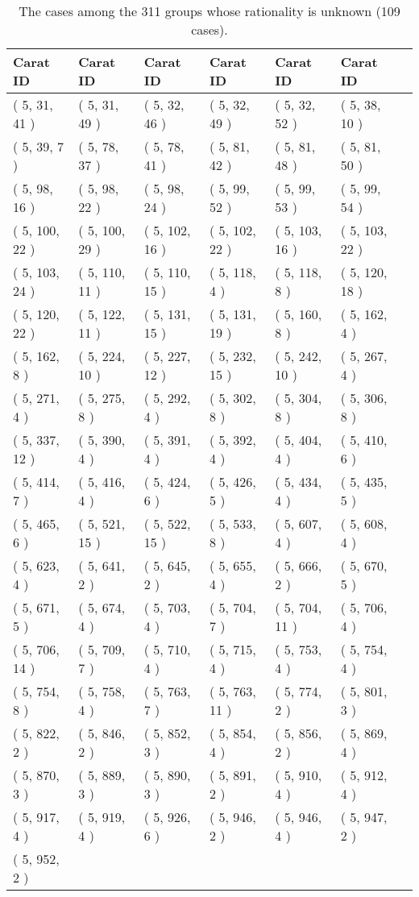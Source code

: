 \begin{table}
\begin{tabular}{lllllll}
Carat ID & Carat ID & Carat ID & Carat ID & Carat ID & Carat ID   \\
\hline
( 5, 31, 41 ) & ( 5, 31, 49 ) & ( 5, 32, 46 ) & ( 5, 32, 49 ) & ( 5, 32, 52 ) & ( 5, 38, 10 ) \\
 ( 5, 39, 7 ) &( 5, 78, 37 ) & ( 5, 78, 41 ) & ( 5, 81, 42 )&  ( 5, 81, 48 ) & ( 5, 81, 50 ) \\
  ( 5, 98, 16 ) & ( 5, 98, 22 ) & ( 5, 98, 24 ) & ( 5, 99, 52 ) & ( 5, 99, 53 ) & ( 5, 99, 54 ) \\
   ( 5, 100, 22 ) & ( 5, 100, 29 )&  ( 5, 102, 16 )& ( 5, 102, 22 ) & ( 5, 103, 16 ) & ( 5, 103, 22 ) \\
    ( 5, 103, 24 ) & ( 5, 110, 11 ) & ( 5, 110, 15 ) & ( 5, 118, 4 ) & ( 5, 118, 8 )&  ( 5, 120, 18 ) \\
     ( 5, 120, 22 ) & ( 5, 122, 11 ) & ( 5, 131, 15 ) & ( 5, 131, 19 ) & ( 5, 160, 8 ) & ( 5, 162, 4 ) \\
      ( 5, 162, 8 ) & ( 5, 224, 10 )&  ( 5, 227, 12 ) & ( 5, 232, 15 ) & ( 5, 242, 10 ) & ( 5, 267, 4 ) \\
  ( 5, 271, 4 ) & ( 5, 275, 8 ) & ( 5, 292, 4 ) & ( 5, 302, 8 ) & ( 5, 304, 8 )&  ( 5, 306, 8 ) \\
  ( 5, 337, 12 ) & ( 5, 390, 4 ) & ( 5, 391, 4 ) & ( 5, 392, 4 ) & ( 5, 404, 4 ) & ( 5, 410, 6 ) \\
   ( 5, 414, 7 ) & ( 5, 416, 4 ) & ( 5, 424, 6 )&   ( 5, 426, 5 ) & ( 5, 434, 4 ) & ( 5, 435, 5 ) \\
    ( 5, 465, 6 ) & ( 5, 521, 15 ) & ( 5, 522, 15 ) & ( 5, 533, 8 ) & ( 5, 607, 4 ) & ( 5, 608, 4 ) \\
     ( 5, 623, 4 )& ( 5, 641, 2 ) & ( 5, 645, 2 ) & ( 5, 655, 4 ) & ( 5, 666, 2 ) & ( 5, 670, 5 ) \\
      ( 5, 671, 5 ) & ( 5, 674, 4 ) & ( 5, 703, 4 ) & ( 5, 704, 7 ) & ( 5, 704, 11 )& ( 5, 706, 4 ) \\
       ( 5, 706, 14 ) & ( 5, 709, 7 ) & ( 5, 710, 4 ) & ( 5, 715, 4 ) & ( 5, 753, 4 ) & ( 5, 754, 4 ) \\
  ( 5, 754, 8 ) & ( 5, 758, 4 ) & ( 5, 763, 7 )&  ( 5, 763, 11 ) & ( 5, 774, 2 ) & ( 5, 801, 3 ) \\
   ( 5, 822, 2 ) &  ( 5, 846, 2 ) & ( 5, 852, 3 ) & ( 5, 854, 4 ) & ( 5, 856, 2 ) & ( 5, 869, 4 ) \\
    ( 5, 870, 3 )&  ( 5, 889, 3 ) & ( 5, 890, 3 ) & ( 5, 891, 2 ) & ( 5, 910, 4 ) & ( 5, 912, 4 ) \\
     ( 5, 917, 4 ) & ( 5, 919, 4 ) & ( 5, 926, 6 ) &  ( 5, 946, 2 ) & ( 5, 946, 4 )& ( 5, 947, 2 ) \\
      ( 5, 952, 2 ) &&&&&
\end{tabular}
\caption{The cases among the 311 groups whose rationality is unknown (109 cases).}
\end{table}

